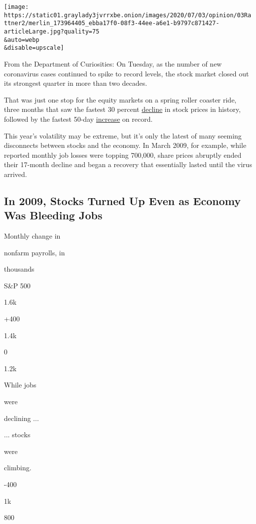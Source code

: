 \texttt{[image: https://static01.graylady3jvrrxbe.onion/images/2020/07/03/opinion/03Rattner2/merlin\_173964405\_ebba17f0-08f3-44ee-a6e1-b9797c871427-articleLarge.jpg?quality=75\\\&auto=webp\\\&disable=upscale]}

From the Department of Curiosities: On Tuesday, as the number of new
coronavirus cases continued to spike to record levels, the stock market
closed out its strongest quarter in more than two decades.

That was just one stop for the equity markets on a spring roller coaster
ride, three months that saw the fastest 30 percent
\href{https://www.cnbc.com/2020/03/23/this-was-the-fastest-30percent-stock-market-decline-ever.html}{decline}
in stock prices in history, followed by the fastest 50-day
\href{https://www.cnbc.com/2020/06/03/this-is-the-greatest-50-day-rally-in-the-history-of-the-sp-500.html}{increase}
on record.

This year's volatility may be extreme, but it's only the latest of many
seeming disconnects between stocks and the economy. In March 2009, for
example, while reported monthly job losses were topping 700,000, share
prices abruptly ended their 17-month decline and began a recovery that
essentially lasted until the virus arrived.

\hypertarget{in-2009-stocks-turned-up-even-as-economy-was-bleeding-jobs}{%
\subsection{In 2009, Stocks Turned Up Even as Economy Was Bleeding
Jobs}\label{in-2009-stocks-turned-up-even-as-economy-was-bleeding-jobs}}

Monthly change in

nonfarm payrolls, in

thousands

S\&P 500

1.6k

+400

1.4k

0

1.2k

While jobs

were

declining ...

... stocks

were

climbing.

-400

1k

800

